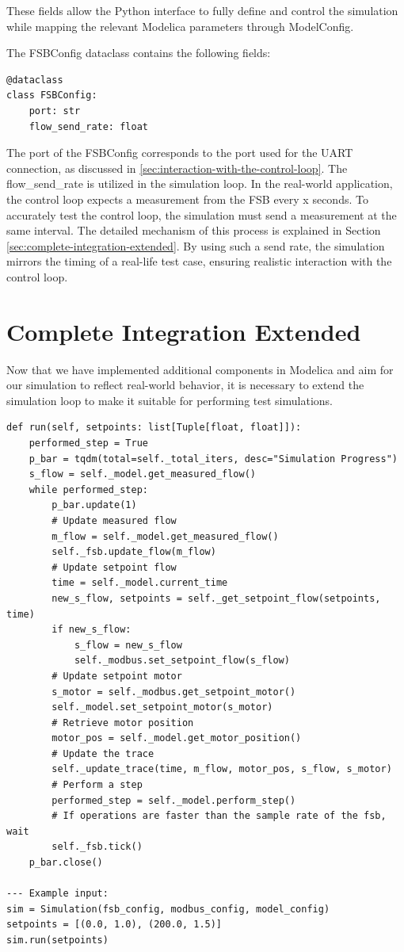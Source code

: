 \documentclass[we,final,11pt,oneside,openany]{uantwerpenbamathesis}
\begin{document}
These fields allow the Python interface to fully define and control the simulation while mapping the relevant Modelica parameters through ModelConfig.

The FSBConfig dataclass contains the following fields:

\begin{lstlisting}[style=pythonstyle, caption={FSBConfig data fields}]
@dataclass
class FSBConfig:
    port: str
    flow_send_rate: float
\end{lstlisting}

The port of the FSBConfig corresponds to the port used for the UART connection, as discussed in \autoref{sec:interaction-with-the-control-loop}.
The flow\_send\_rate is utilized in the simulation loop.
In the real-world application, the control loop expects a measurement from the FSB every x seconds.
To accurately test the control loop, the simulation must send a measurement at the same interval.
The detailed mechanism of this process is explained in Section \autoref{sec:complete-integration-extended}.
By using such a send rate, the simulation mirrors the timing of a real-life test case, ensuring realistic interaction with the control loop.

\section{Complete Integration Extended}
\label{sec:complete-integration-extended}

Now that we have implemented additional components in Modelica and aim for our simulation to reflect real-world behavior, it is necessary to extend the simulation loop to make it suitable for performing test simulations.

\begin{lstlisting}[style=pythonstyle, caption={Extended simulation loop}]
def run(self, setpoints: list[Tuple[float, float]]):
    performed_step = True
    p_bar = tqdm(total=self._total_iters, desc="Simulation Progress")
    s_flow = self._model.get_measured_flow()
    while performed_step:
        p_bar.update(1)
        # Update measured flow
        m_flow = self._model.get_measured_flow()
        self._fsb.update_flow(m_flow)
        # Update setpoint flow
        time = self._model.current_time
        new_s_flow, setpoints = self._get_setpoint_flow(setpoints, time)
        if new_s_flow:
            s_flow = new_s_flow
            self._modbus.set_setpoint_flow(s_flow)
        # Update setpoint motor
        s_motor = self._modbus.get_setpoint_motor()
        self._model.set_setpoint_motor(s_motor)
        # Retrieve motor position
        motor_pos = self._model.get_motor_position()
        # Update the trace
        self._update_trace(time, m_flow, motor_pos, s_flow, s_motor)
        # Perform a step
        performed_step = self._model.perform_step()
        # If operations are faster than the sample rate of the fsb, wait
        self._fsb.tick()
    p_bar.close()

--- Example input:
sim = Simulation(fsb_config, modbus_config, model_config)
setpoints = [(0.0, 1.0), (200.0, 1.5)]
sim.run(setpoints)
\end{lstlisting}
\end{document}
